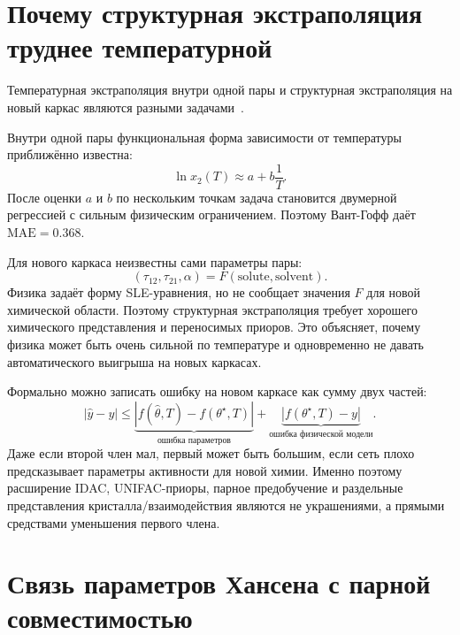 \documentclass[11pt]{article}
\newcommand{\mae}{\mathrm{MAE}}
\newcommand{\abs}[1]{\left\lvert #1 \right\rvert}
\theoremstyle{definition}
\begin{document}
\section{Почему структурная экстраполяция труднее температурной}
\label{app:structural-vs-temperature}

Температурная экстраполяция внутри одной пары и структурная экстраполяция на новый каркас являются разными задачами~\cite{hildebrand1970,apelblat1999,vermeire2022}.

Внутри одной пары функциональная форма зависимости от температуры приближённо известна:
\begin{equation*}
    \ln x_2(T) \approx a+b\frac{1}{T}.
\end{equation*}
После оценки $a$ и $b$ по нескольким точкам задача становится двумерной регрессией с сильным физическим ограничением. Поэтому Вант-Гофф даёт $\mae=0.368$.

Для нового каркаса неизвестны сами параметры пары:
\begin{equation*}
    (\tau_{12},\tau_{21},\alpha)
    =
    F(\mathrm{solute},\mathrm{solvent}).
\end{equation*}
Физика задаёт форму SLE-уравнения, но не сообщает значения $F$ для новой химической области. Поэтому структурная экстраполяция требует хорошего химического представления и переносимых приоров. Это объясняет, почему физика может быть очень сильной по температуре и одновременно не давать автоматического выигрыша на новых каркасах.

Формально можно записать ошибку на новом каркасе как сумму двух частей:
\begin{equation*}
    \abs{\widehat y-y}
    \le
    \underbrace{\abs{f(\widehat\theta,T)-f(\theta^\star,T)}}_{\text{ошибка параметров}}
    +
    \underbrace{\abs{f(\theta^\star,T)-y}}_{\text{ошибка физической модели}}.
\end{equation*}
Даже если второй член мал, первый может быть большим, если сеть плохо предсказывает параметры активности для новой химии. Именно поэтому расширение IDAC, UNIFAC-приоры, парное предобучение и раздельные представления кристалла/взаимодействия являются не украшениями, а прямыми средствами уменьшения первого члена.

\section{Связь параметров Хансена с парной совместимостью}
\label{app:hansen}
\end{document}
